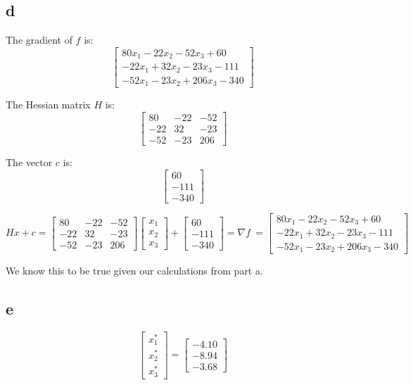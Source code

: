 \documentclass[10pt]{article}
\begin{document}
\subsection{d}
The gradient of \( f \) is:
\[
\begin{bmatrix}
80x_1 - 22x_2 - 52x_3 + 60 \\
-22x_1 + 32x_2 - 23x_3 - 111 \\
-52x_1 - 23x_2 + 206x_3 - 340
\end{bmatrix}
\]

The Hessian matrix \( H \) is:
\[
\begin{bmatrix}
80 & -22 & -52 \\
-22 & 32 & -23 \\
-52 & -23 & 206
\end{bmatrix}
\]

The vector \( c \) is:
\[
\begin{bmatrix}
60 \\
-111 \\
-340
\end{bmatrix}
\]

\[
Hx + c =  
\begin{bmatrix}
80 & -22 & -52 \\
-22 & 32 & -23 \\
-52 & -23 & 206
\end{bmatrix}
\begin{bmatrix}
x_1 \\
x_2 \\
x_3
\end{bmatrix}
+
\begin{bmatrix}
60 \\
-111 \\
-340
\end{bmatrix}
= \nabla f \ =
\begin{bmatrix}
80x_1 - 22x_2 - 52x_3 + 60 \\
-22x_1 + 32x_2 - 23x_3 - 111 \\
-52x_1 - 23x_2 + 206x_3 - 340
\end{bmatrix}
\]

We know this to be true given our calculations from part a.

\subsection{e}
\[
\begin{bmatrix}
x_1^* \\
x_2^*\\
x_3^*
\end{bmatrix} =
\begin{bmatrix}
  -4.10 \\
  -8.94\\
  -3.68
\end{bmatrix}
\]
\end{document}

